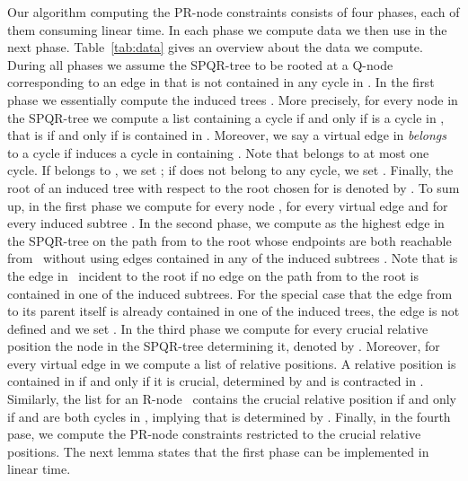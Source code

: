 \documentclass{scrartcl}
\renewcommand{\todo}[1]{}
\newcommand{\1}[1]{{\normalfont \ensuremath{#1^{\tiny\circled{1}}}}} \newcommand{\2}[1]{{\normalfont \ensuremath{#1^{\tiny\circled{2}}}}} \renewcommand{\k}[1]{{\normalfont \ensuremath{#1^{\tiny\circled{k}}}}} \newcommand{\proj}[2]{\ensuremath{\left.#1\right|_{#2}}} \newcommand{\eps}{\varepsilon}
\theoremstyle{plain} \newtheorem{theorem}{Theorem} \newcounter{lemmacounter} \setcounter{lemmacounter}{0} \newtheorem{lemma}[lemmacounter]{Lemma} \newtheorem{fact}{Fact}  \newtheorem{corollary}{Corollary} \theoremstyle{definition} \newtheorem{definition}{Definition}
\begin{document}
Our algorithm computing the PR-node constraints consists of four
phases, each of them consuming linear time.  In each phase we compute
data we then use in the next phase.  Table~\ref{tab:data} gives an
overview about the data we compute.  During all phases we assume the
SPQR-tree  to be rooted at a Q-node corresponding to an
edge in  that is not contained in any cycle in .  In
the first phase we essentially compute the induced trees
.  More precisely, for every node  in the
SPQR-tree we compute a list  containing a cycle  if and
only if  is a cycle in \todo{Pag 16, line 19:}, that is
if and only if  is contained in .
Moreover, we say a virtual edge  in  \emph{belongs}
to a cycle  if  induces a cycle in  containing
.  Note that  belongs to at most one cycle.  If 
belongs to , we set ; if  does not belong to
any cycle, we set .  Finally, the root of an
induced tree  with respect to the root chosen
for  is denoted by .  To sum
up, in the first phase we compute  for every node ,
 for every virtual edge  and  for every induced subtree .  In the
second phase, we compute  as the highest edge in the
SPQR-tree  on the path from  to the root whose
endpoints are both reachable from~ without using edges contained
in any of the induced subtrees .  Note that
 is the edge in~ incident to the root if no
edge on the path from  to the root is contained in one of the
induced subtrees.  For the special case that the edge from  to
its parent itself is already contained in one of the induced trees,
the edge  is not defined and we set .
In the third phase we compute for every crucial relative position
 the node in the SPQR-tree determining it, denoted by
.  Moreover, for every virtual edge  in
 we compute a list  of relative positions.
A relative position  is contained in  if and
only if it is crucial, determined by  and  is contracted in
.  Similarly, the list  for an R-node~
contains the crucial relative position  if and only if 
and  are both cycles in , implying that 
is determined by .  Finally, in the fourth pase, we compute the
PR-node constraints restricted to the crucial relative positions.  The
next lemma states that the first phase can be implemented in linear
time.
\end{document}
